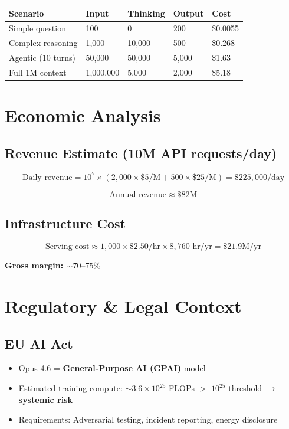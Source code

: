 \documentclass[11pt,a4paper]{article}
\begin{document}
\begin{center}
\begin{tabular}{lllll}
\toprule
\textbf{Scenario} & \textbf{Input} & \textbf{Thinking} & \textbf{Output} & \textbf{Cost} \\
\midrule
Simple question & 100 & 0 & 200 & \$0.0055 \\
Complex reasoning & 1,000 & 10,000 & 500 & \$0.268 \\
Agentic (10 turns) & 50,000 & 50,000 & 5,000 & \$1.63 \\
Full 1M context & 1,000,000 & 5,000 & 2,000 & \$5.18 \\
\bottomrule
\end{tabular}
\end{center}

\section{Economic Analysis}

\subsection{Revenue Estimate (10M API requests/day)}

$$\text{Daily revenue} = 10^7 \times (2{,}000 \times \$5/\text{M} + 500 \times \$25/\text{M}) = \$225{,}000/\text{day}$$

$$\text{Annual revenue} \approx \$82\text{M}$$

\subsection{Infrastructure Cost}

$$\text{Serving cost} \approx 1{,}000 \times \$2.50/\text{hr} \times 8{,}760\text{ hr/yr} = \$21.9\text{M/yr}$$

\textbf{Gross margin: $\sim 70\text{--}75\%$}

\section{Regulatory \& Legal Context}

\subsection{EU AI Act}

\begin{itemize}
  \item Opus 4.6 = \textbf{General-Purpose AI (GPAI)} model
  \item Estimated training compute: $\sim 3.6 \times 10^{25}$ FLOPs $>$ $10^{25}$ threshold $\to$ \textbf{systemic risk}
  \item Requirements: Adversarial testing, incident reporting, energy disclosure
\end{itemize}
\end{document}
